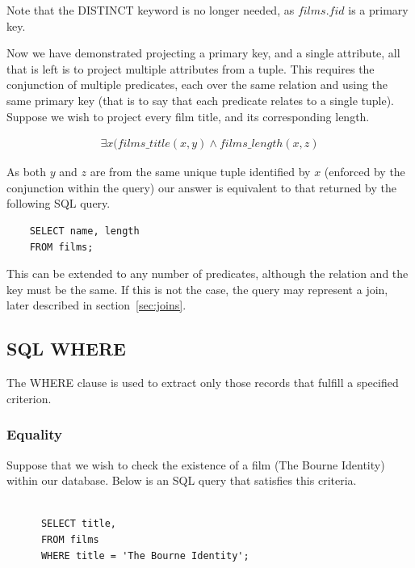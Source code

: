 \documentclass[a4paper, 11pt]{article}
\begin{document}
    Note that the DISTINCT keyword is no longer needed, as $films.fid$ is a
    primary key.

    Now we have demonstrated projecting a primary key, and a single attribute,
    all that is left is to project multiple attributes from a tuple. This
    requires the conjunction of multiple predicates, each over the same
    relation and using the same primary key (that is to say that each predicate
    relates to a single tuple). Suppose we wish to project
    every film title, and its corresponding length.

    \begin{gather}
      \exists x(films\_title(x, y) \land films\_length(x, z)
    \end{gather}

    As both $y$ and $z$ are from the same unique tuple identified by $x$
    (enforced by the conjunction within the query) our
    answer is equivalent to that returned by the following SQL query.

    \begin{verbatim}
    SELECT name, length
    FROM films;
    \end{verbatim}

    This can be extended to any number of predicates, although the relation and
    the key must be the same. If this is not the case, the query may represent
    a join, later described in section~\ref{sec:joins}.

  \subsection{SQL WHERE}

    The WHERE clause is used to extract only those records that fulfill a
    specified criterion.~\cite{w3WHERE} 

    \subsubsection{Equality}

      Suppose that we wish to check the existence of a film (The Bourne
      Identity) within our database. Below is an SQL query that satisfies this
      criteria.

      \begin{verbatim}

      SELECT title,
      FROM films
      WHERE title = 'The Bourne Identity';

      \end{verbatim}
\end{document}
